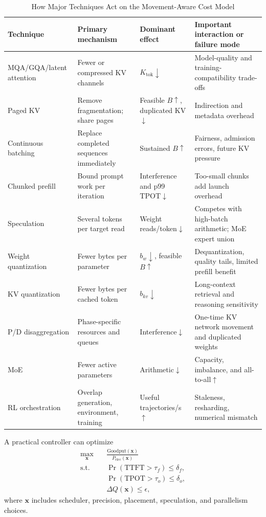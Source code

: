 \documentclass[journal]{IEEEtran}
\newcommand{\TTFT}{\ensuremath{\mathrm{TTFT}}}
\newcommand{\TPOT}{\ensuremath{\mathrm{TPOT}}}
\newcommand{\Goodput}{\ensuremath{\mathrm{Goodput}}}
\begin{document}
\begin{table}[t]
\caption{How Major Techniques Act on the Movement-Aware Cost Model}
\label{tab:levers}
\centering
\scriptsize
\begin{tabularx}{\textwidth}{@{}p{}p{}p{}X@{}}
\toprule
Technique & Primary mechanism & Dominant effect & Important interaction or failure mode \\
\midrule
MQA/GQA/latent attention & Fewer or compressed KV channels & $K_{\mathrm{tok}}\downarrow$ & Model-quality and training-compatibility trade-offs \\
Paged KV & Remove fragmentation; share pages & Feasible $B\uparrow$, duplicated KV$\downarrow$ & Indirection and metadata overhead \\
Continuous batching & Replace completed sequences immediately & Sustained $B\uparrow$ & Fairness, admission errors, future KV pressure \\
Chunked prefill & Bound prompt work per iteration & Interference and p99 \TPOT$\downarrow$ & Too-small chunks add launch overhead \\
Speculation & Several tokens per target read & Weight reads/token$\downarrow$ & Competes with high-batch arithmetic; MoE expert union \\
Weight quantization & Fewer bytes per parameter & $b_w\downarrow$, feasible $B\uparrow$ & Dequantization, quality tails, limited prefill benefit \\
KV quantization & Fewer bytes per cached token & $b_{kv}\downarrow$ & Long-context retrieval and reasoning sensitivity \\
P/D disaggregation & Phase-specific resources and queues & Interference$\downarrow$ & One-time KV network movement and duplicated weights \\
MoE & Fewer active parameters & Arithmetic$\downarrow$ & Capacity, imbalance, and all-to-all$\uparrow$ \\
RL orchestration & Overlap generation, environment, training & Useful trajectories/s$\uparrow$ & Staleness, resharding, numerical mismatch \\
\bottomrule
\end{tabularx}
\end{table}

A practical controller can optimize
\begin{equation}
\begin{aligned}
\max_{\mathbf{x}}\quad & \frac{\Goodput(\mathbf{x})}{\overline{P}_{\mathrm{elec}}(\mathbf{x})} \\
\mathrm{s.t.}\quad & \Pr(\TTFT>\tau_f)\leq\delta_f,\\
& \Pr(\TPOT>\tau_o)\leq\delta_o,\\
& \Delta Q(\mathbf{x})\leq\epsilon,
\end{aligned}
\label{eq:joint-opt}
\end{equation}
where $\mathbf{x}$ includes scheduler, precision, placement, speculation, and parallelism choices.
\end{document}
